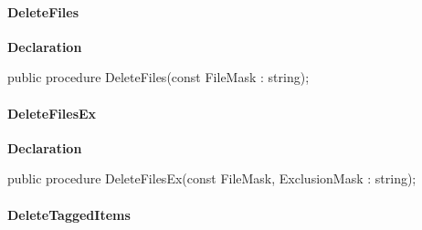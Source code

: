 \documentclass{report}
\newif\ifpdf
\begin{document}
\paragraph*{DeleteFiles}\hspace*{\fill}

\label{AbZipper.TAbCustomZipper-DeleteFiles}
\begin{list}{}{
\setlength{\itemindent}{0cm}
\setlength{\listparindent}{0cm}
\setlength{\leftmargin}{\evensidemargin}
\addtolength{\leftmargin}{\tmplength}
\settowidth{\labelsep}{X}
\addtolength{\leftmargin}{\labelsep}
\setlength{\labelwidth}{\tmplength}
}
\item[\textbf{Declaration}\hfill]
\ifpdf
\begin{flushleft}
\fi
\begin{ttfamily}
public procedure DeleteFiles(const FileMask : string);\end{ttfamily}

\ifpdf
\end{flushleft}
\fi

\end{list}
\paragraph*{DeleteFilesEx}\hspace*{\fill}

\label{AbZipper.TAbCustomZipper-DeleteFilesEx}
\begin{list}{}{
\setlength{\itemindent}{0cm}
\setlength{\listparindent}{0cm}
\setlength{\leftmargin}{\evensidemargin}
\addtolength{\leftmargin}{\tmplength}
\settowidth{\labelsep}{X}
\addtolength{\leftmargin}{\labelsep}
\setlength{\labelwidth}{\tmplength}
}
\item[\textbf{Declaration}\hfill]
\ifpdf
\begin{flushleft}
\fi
\begin{ttfamily}
public procedure DeleteFilesEx(const FileMask, ExclusionMask : string);\end{ttfamily}

\ifpdf
\end{flushleft}
\fi

\end{list}
\paragraph*{DeleteTaggedItems}\hspace*{\fill}
\end{document}
